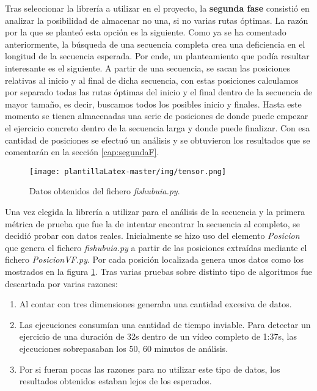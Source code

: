 Tras seleccionar la librería a utilizar en el proyecto, la \textbf{segunda fase} consistió en analizar la posibilidad de almacenar no una, si no varias rutas óptimas. La razón por la que se planteó esta opción es la siguiente. Como ya se ha comentado anteriormente, la búsqueda de una secuencia completa crea una deficiencia en el longitud de la secuencia esperada. Por ende, un planteamiento que podía resultar interesante es el siguiente. A partir de una secuencia, se sacan las posiciones relativas al inicio y al final de dicha secuencia, con estas posiciones calculamos por separado todas las rutas óptimas del inicio y el final dentro de la secuencia de mayor tamaño, es decir, buscamos todos los posibles inicio y finales. Hasta este momento se tienen almacenadas una serie de posiciones de donde puede empezar el ejercicio concreto dentro de la secuencia larga y donde puede finalizar. Con esa cantidad de posiciones se efectuó un análisis y se obtuvieron los resultados que se comentarán en la sección \ref{cap:segundaF}.

\begin{figure}
    \centering
    \texttt{[image: plantillaLatex-master/img/tensor.png]}
    \caption{Datos obtenidos del fichero \textit{fishubuia.py}.}
    \label{fig:tensor}
\end{figure}

Una vez elegida la librería a utilizar para el análisis de la secuencia y la primera métrica de prueba que fue la de intentar encontrar la secuencia al completo, se decidió probar con datos reales. Inicialmente se hizo uso del elemento \emph{Posicion} que genera el fichero \textit{fishubuia.py} a partir de las posiciones extraídas mediante el fichero \textit{PosicionVF.py}. Por cada posición localizada genera unos datos como los mostrados en la figura \ref{fig:tensor}. Tras varias pruebas sobre distinto tipo de algoritmos fue descartada por varias razones:
\begin{enumerate}
    \item Al contar con tres dimensiones generaba una cantidad excesiva de datos.
    \item Las ejecuciones consumían una cantidad de tiempo inviable. Para detectar un ejercicio de una duración de 32s dentro de un vídeo completo de 1:37s, las ejecuciones sobrepasaban los 50, 60 minutos de análisis. 
    \item Por si fueran pocas las razones para no utilizar este tipo de datos, los resultados obtenidos estaban lejos de los esperados.
\end{enumerate}

